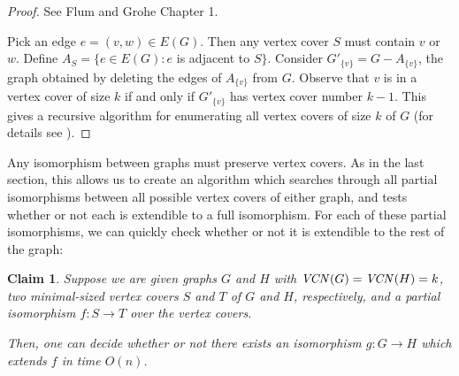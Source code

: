 \documentclass[11pt]{report}
\newtheorem{claim}{Claim}
\newcommand{\vcn}{\mbox{\emph{VCN}}}
\begin{document}
\begin{proof} See Flum and Grohe \cite{FlumGrohe} Chapter 1.

Pick an edge $e = (v,w) \in E(G)$. Then any vertex cover $S$ must contain $v$ or $w$. Define $A_S=\{ e \in E(G) : e$ is adjacent to $S  \}$. Consider $G'_{\{v\}}=G-A_{\{v\}}$, the graph obtained by deleting the edges of $A_{\{v\}}$ from $G$. Observe that $v$ is in a vertex cover of size $k$ if and only if $G'_{\{v\}}$ has vertex cover number $k-1$. This gives a recursive algorithm for enumerating all vertex covers of size $k$ of $G$ (for details see \cite{FlumGrohe}).


\end{proof}


Any isomorphism between graphs must preserve vertex covers. As in the last section, this allows us to create an algorithm which searches through all partial isomorphisms between all possible vertex covers of either graph, and tests whether or not each is extendible to a full isomorphism. For each of these partial isomorphisms, we can quickly check whether or not it is extendible to the rest of the graph:


\begin{claim} Suppose we are given graphs $G$ and $H$ with $\vcn(G)=\vcn(H)=k$, two minimal-sized vertex covers $S$ and $T$ of $G$ and $H$, respectively, and a partial isomorphism $f:S \rightarrow T$ over the vertex covers. 

Then, one can decide whether or not there exists an isomorphism $g:G \rightarrow H$ which extends $f$ in time $O(n)$.
\label{clm_vcn_extendable_n}
\end{claim}
\end{document}
